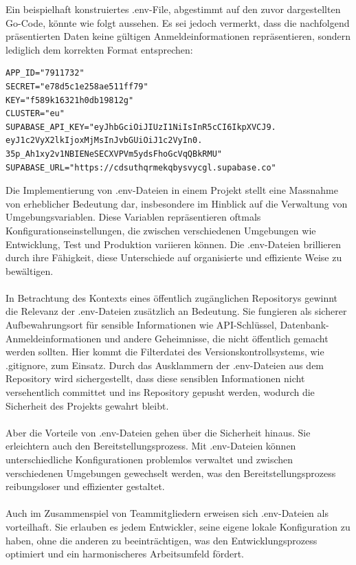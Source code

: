 Ein beispielhaft konstruiertes .env-File, abgestimmt auf den zuvor dargestellten Go-Code, könnte wie folgt aussehen. Es sei jedoch vermerkt, dass die nachfolgend präsentierten Daten keine gültigen Anmeldeinformationen repräsentieren, sondern lediglich dem korrekten Format entsprechen:
\begin{lstlisting}
APP_ID="7911732"
SECRET="e78d5c1e258ae511ff79"
KEY="f589k16321h0db19812g"
CLUSTER="eu"
SUPABASE_API_KEY="eyJhbGciOiJIUzI1NiIsInR5cCI6IkpXVCJ9.
eyJ1c2VyX2lkIjoxMjMsInJvbGUiOiJ1c2VyIn0.
35p_Ah1xy2v1NBIENeSECXVPVm5ydsFhoGcVqQBkRMU"
SUPABASE_URL="https://cdsuthqrmekqbysvycgl.supabase.co"
\end{lstlisting}
Die Implementierung von .env-Dateien in einem Projekt stellt eine Massnahme von erheblicher Bedeutung dar, insbesondere im Hinblick auf die Verwaltung von Umgebungsvariablen. Diese Variablen repräsentieren oftmals Konfigurationseinstellungen, die zwischen verschiedenen Umgebungen wie Entwicklung, Test und Produktion variieren können. Die .env-Dateien brillieren durch ihre Fähigkeit, diese Unterschiede auf organisierte und effiziente Weise zu bewältigen.\\\\
In Betrachtung des Kontexts eines öffentlich zugänglichen Repositorys gewinnt die Relevanz der .env-Dateien zusätzlich an Bedeutung. Sie fungieren als sicherer Aufbewahrungsort für sensible Informationen wie API-Schlüssel, Datenbank-Anmeldeinformationen und andere Geheimnisse, die nicht öffentlich gemacht werden sollten. Hier kommt die Filterdatei des Versionskontrollsystems, wie .gitignore, zum Einsatz. Durch das Ausklammern der .env-Dateien aus dem Repository wird sichergestellt, dass diese sensiblen Informationen nicht versehentlich committet und ins Repository gepusht werden, wodurch die Sicherheit des Projekts gewahrt bleibt.\\\\
Aber die Vorteile von .env-Dateien gehen über die Sicherheit hinaus. Sie erleichtern auch den Bereitstellungsprozess. Mit .env-Dateien können unterschiedliche Konfigurationen problemlos verwaltet und zwischen verschiedenen Umgebungen gewechselt werden, was den Bereitstellungsprozess reibungsloser und effizienter gestaltet.\\\\
Auch im Zusammenspiel von Teammitgliedern erweisen sich .env-Dateien als vorteilhaft. Sie erlauben es jedem Entwickler, seine eigene lokale Konfiguration zu haben, ohne die anderen zu beeinträchtigen, was den Entwicklungsprozess optimiert und ein harmonischeres Arbeitsumfeld fördert.\\\\
